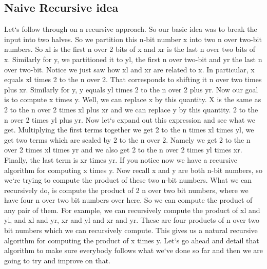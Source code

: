 \subsection{Naive  Recursive idea}
Let`s follow through on a recursive approach.
So our basic idea was to break the input into two halves.
So we partition this n-bit number x into two n over two-bit numbers.
So xl is the first n over 2 bits of x and xr is the last n over two bits of x.
Similarly for y, we partitioned it to yl, the first n over two-bit and yr the last n over two-bit.
Notice we just saw how xl and xr are related to x.
In particular, x equals xl times 2 to the n over 2.
That corresponds to shifting it n over two times plus xr.
Similarly for y, y equals yl times 2 to the n over 2 plus yr.
Now our goal is to compute x times y.
Well, we can replace x by this quantity.
X is the same as 2 to the n over 2 times xl plus xr and we can replace y by this quantity. 2 to the n over 2 times yl plus yr.
Now let`s expand out this expression and see what we get.
Multiplying the first terms together we get 2 to the n times xl times yl, we get two terms which are scaled by 2 to the n over 2.
Namely we get 2 to the n over 2 times xl times yr and we also get 2 to the n over 2 times yl times xr.
Finally, the last term is xr times yr.
If you notice now we have a recursive algorithm for computing x times y.
Now recall x and y are both n-bit numbers, so we`re trying to compute the product of these two n-bit numbers.
What we can recursively do, is compute the product of 2 n over two bit numbers, where we have four n over two bit numbers over here.
So we can compute the product of any pair of them.
For example, we can recursively compute the product of xl and yl, and xl and yr, xr and yl and xr and yr.
These are four products of n over two bit numbers which we can recursively compute.
This gives us a natural recursive algorithm for computing the product of x times y.
Let`s go ahead and detail that algorithm to make sure everybody follows what we`ve done so far and then we are going to try and improve on that.

